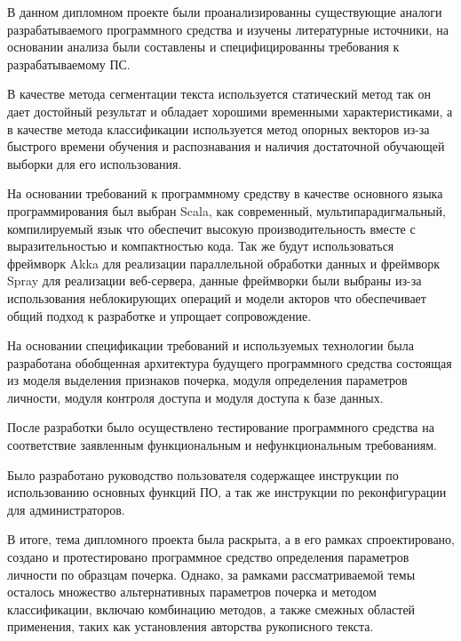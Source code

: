 \label{sec:outro}

В данном дипломном проекте были проанализированны существующие аналоги разрабатываемого программного средства и изучены литературные источники, на основании анализа были составлены и специфицированны требования к разрабатываемому ПС.

В качестве метода сегментации текста используется статический метод так он дает достойный результат и обладает хорошими временными характеристиками, а в качестве метода классификации используется метод опорных векторов из-за быстрого времени обучения и распознавания и наличия достаточной обучающей выборки для его использования.

На основании требований к программному средству в качестве основного языка программирования был выбран Scala, как современный, мультипарадигмальный, компилируемый язык что обеспечит высокую производительность вместе с выразительностью и компактностью кода. Так же будут использоваться фреймворк Akka для реализации параллельной обработки данных и фреймворк Spray для реализации веб-сервера, данные фреймворки были выбраны из-за использования неблокирующих операций и модели акторов что обеспечивает общий подход к разработке и упрощает сопровождение.

На основании спецификации требований и используемых технологии была разработана обобщенная архитектура будущего программного средства состоящая из моделя выделения признаков почерка, модуля определения параметров личности, модуля контроля доступа и модуля доступа к базе данных.

После разработки было осуществлено тестирование программного средства на соответствие заявленным функциональным и нефункциональным требованиям.

Было разработано руководство пользователя содержащее инструкции по использованию основных функций ПО, а так же инструкции по реконфигурации для администраторов.

В итоге, тема дипломного проекта была раскрыта, а в его рамках спроектировано, создано и протестировано программное средство определения параметров личности по образцам почерка. Однако, за рамками рассматриваемой темы осталось множество альтернативных параметров почерка и методом классификации, включаю комбинацию методов, а также смежных областей применения, таких как установления авторства рукописного текста. 